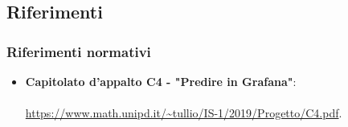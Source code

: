 \documentclass[../norme-di-progetto.tex]{subfiles}
\begin{document}
\subsection{Riferimenti}
\subsubsection{Riferimenti normativi}
\begin{itemize}
  \item \textbf{Capitolato d'appalto C4 - "Predire in Grafana"}: \\ \\ \href{https://www.math.unipd.it/~tullio/IS-1/2019/Progetto/C4.pdf}{https://www.math.unipd.it/\textasciitilde tullio/IS-1/2019/Progetto/C4.pdf}.
\end{itemize}
\end{document}
